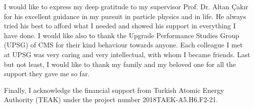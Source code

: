 \vspace*{-6pt}
I would like to express my deep gratitude to my supervisor Prof. Dr. Altan Çakır for his excellent guidance in my pursuit in particle physics and in life. He always tried his best to afford what I needed and showed his support in everything I have done. I would like also to thank the Upgrade Performance Studies Group (UPSG) of CMS for their kind behaviour towards anyone. Each colleague I met at UPSG was very caring and very intellectual, with whom I became friends. Last but not least, I would like to thank my family and my beloved one for all the support they gave me so far.

Finally, I acknowledge the financial support from Turkish Atomic Energy Authority (TEAK) under the project number 2018TAEK-A5.H6.F2-21.